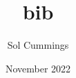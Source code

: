 \documentclass{article}
\title{bib}
\author{Sol Cummings}
\date{November 2022}
\begin{document}
\nocite{*}


\end{document}
